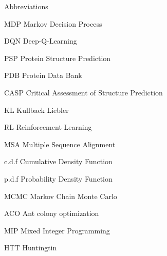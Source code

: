 
\begin{dictionary}{Abbreviations}
\item[MDP]  Markov Decision Process
\item[DQN]  Deep-Q-Learning
\item[PSP]  Protein Structure Prediction
\item[PDB]  Protein Data Bank
\item[CASP] Critical Assessment of Structure Prediction
\item[KL]   Kullback Liebler
\item[RL]   Reinforcement Learning
\item[MSA]  Multiple Sequence Alignment
\item[c.d.f] Cumulative Density Function
\item[p.d.f] Probability Density Function 
\item[MCMC] Markov Chain Monte Carlo
\item[ACO] Ant colony optimization
\item[MIP] Mixed Integer Programming 
\item[HTT] Huntingtin 
\end{dictionary}
